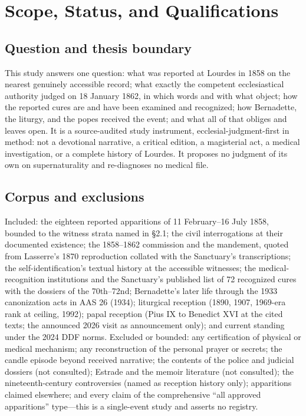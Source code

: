 \sectionguard
\section{Scope, Status, and Qualifications}

\subsection*{Question and thesis boundary}

This study answers one question: what was reported at Lourdes in
1858 on the nearest genuinely accessible record; what exactly the
competent ecclesiastical authority judged on 18 January 1862, in
which words and with what object; how the reported cures are and
have been examined and recognized; how Bernadette, the liturgy,
and the popes received the event; and what all of that obliges
and leaves open. It is a source-audited study instrument,
ecclesial-judgment-first in method: not a devotional narrative, a
critical edition, a magisterial act, a medical investigation, or
a complete history of Lourdes. It proposes no judgment of its own
on supernaturality and re-diagnoses no medical file.

\subsection*{Corpus and exclusions}

Included: the eighteen reported apparitions of 11 February--16
July 1858, bounded to the witness strata named in \S2.1; the
civil interrogations at their documented existence; the
1858--1862 commission and the mandement, quoted from Lasserre's
1870 reproduction collated with the Sanctuary's transcriptions;
the self-identification's textual history at the accessible
witnesses; the medical-recognition institutions and the
Sanctuary's published list of 72 recognized cures with the
dossiers of the 70th--72nd; Bernadette's later life through the
1933 canonization acts in AAS 26 (1934); liturgical reception
(1890, 1907, 1969-era rank at ceiling, 1992); papal reception
(Pius IX to Benedict XVI at the cited texts; the announced 2026
visit as announcement only); and current standing under the 2024
DDF norms. Excluded or bounded: any certification of physical or
medical mechanism; any reconstruction of the personal prayer or
secrets; the candle episode beyond received narrative; the
contents of the police and judicial dossiers (not consulted);
Estrade and the memoir literature (not consulted); the
nineteenth-century controversies (named as reception history
only); apparitions claimed elsewhere; and every claim of the
comprehensive ``all approved apparitions'' type---this is a
single-event study and asserts no registry.

